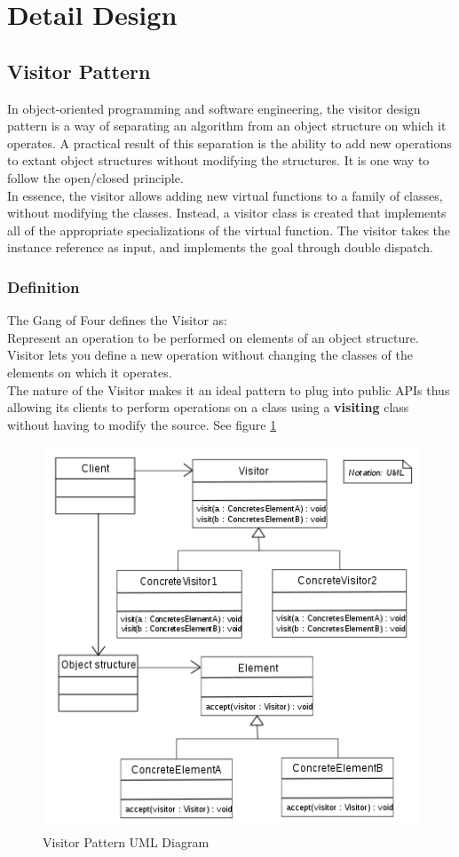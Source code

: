\section{Detail Design}
\subsection{Visitor Pattern}
In object-oriented programming and software engineering, the visitor design pattern is a way of separating an algorithm from an object structure on which it operates. A practical result of this separation is the ability to add new operations to extant object structures without modifying the structures. It is one way to follow the open/closed principle.\\
In essence, the visitor allows adding new virtual functions to a family of classes, without modifying the classes. Instead, a visitor class is created that implements all of the appropriate specializations of the virtual function. The visitor takes the instance reference as input, and implements the goal through double dispatch.
\subsubsection{Definition}
The Gang of Four defines the Visitor as:\\
Represent an operation to be performed on elements of an object structure. Visitor lets you define a new operation without changing the classes of the elements on which it operates.\\
The nature of the Visitor makes it an ideal pattern to plug into public APIs thus allowing its clients to perform operations on a class using a \textbf{visiting} class without having to modify the source. See figure \ref{fig:visitordesignpattern}
\begin{figure}
	\centering
	\includegraphics[width=\linewidth]{images/Visitor_design_pattern}
	\caption{Visitor Pattern UML Diagram}
	\label{fig:visitordesignpattern}
\end{figure}

